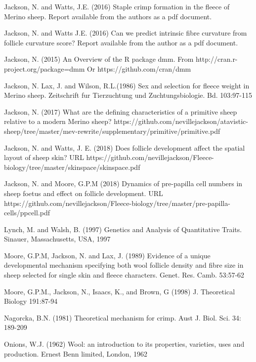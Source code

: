 \documentclass[titlepage]{article}  %
\begin{document}
\begin{thebibliography}{99}
Jackson, N. and Watts, J.E. (2016) Staple crimp formation in the fleece of Merino sheep. 
Report available from the authors as a pdf document.

Jackson, N.  and Watts J.E. (2016) Can we predict intrinsic fibre curvature from follicle curvature score? Report available from the author as a pdf document.

Jackson, N. (2015) An Overview of the R package dmm.
    From http://cran.r-project.org/package=dmm
    Or https://github.com/cran/dmm

Jackson, N. Lax, J. and Wilson, R.L.(1986) Sex and selection for fleece weight in Merino sheep. Zeitschrift fur Tierzuchtung und Zuchtungsbiologie. Bd. 103:97-115

Jackson, N. (2017) What are the defining characteristics of a primitive sheep relative to a modern Merino sheep? https://github.com/nevillejackson/atavistic-sheep/tree/master/mev-rewrite/supplementary/primitive/primitive.pdf

Jackson, N. and Watts, J. E. (2018) Does follicle development affect the spatial layout of sheep skin? URL https://github.com/nevillejackson/Fleece-biology/tree/master/skinspace/skinspace.pdf

Jackson, N. and Moore, G.P.M (2018) Dynamics of pre-papilla cell numbers in sheep foetus and effect on follicle development. URL https://github.com/nevillejackson/Fleece-biology/tree/master/pre-papilla-cells/ppcell.pdf

Lynch, M. and Walsh, B. (1997) Genetics and Analysis of Quantitative Traits. Sinauer, Massachusetts, USA, 1997

Moore, G.P.M, Jackson, N. and Lax, J. (1989) Evidence of a unique developmental mechanism specifying both wool follicle density and fibre size in sheep selected for single skin and fleece characters. Genet. Res. Camb.  53:57-62

Moore, G.P.M., Jackson, N., Isaacs, K., and Brown, G (1998) J. Theoretical Biology 191:87-94

Nagorcka, B.N. (1981) Theoretical mechanism for crimp.
     Aust J. Biol. Sci. 34: 189-209

Onions, W.J. (1962) Wool: an introduction to its properties, varieties, uses
     and production. Ernest Benn limited, London, 1962


\end{thebibliography}
\end{document}
